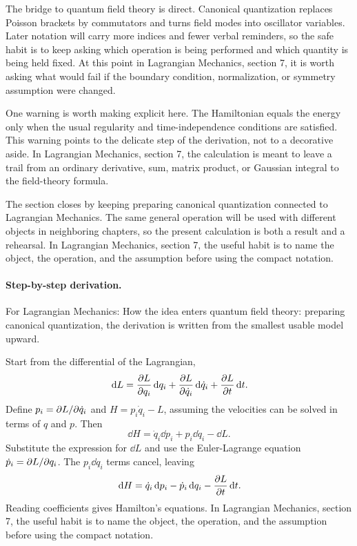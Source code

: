 The bridge to quantum field theory is direct.  Canonical quantization replaces Poisson brackets by commutators and turns field modes into oscillator variables.  Later notation will carry more indices and fewer verbal reminders, so the safe habit is to keep asking which operation is being performed and which quantity is being held fixed.  At this point in Lagrangian Mechanics, section 7, it is worth asking what would fail if the boundary condition, normalization, or symmetry assumption were changed.

One warning is worth making explicit here.  The Hamiltonian equals the energy only when the usual regularity and time-independence conditions are satisfied.  This warning points to the delicate step of the derivation, not to a decorative aside.  In Lagrangian Mechanics, section 7, the calculation is meant to leave a trail from an ordinary derivative, sum, matrix product, or Gaussian integral to the field-theory formula.

The section closes by keeping preparing canonical quantization connected to Lagrangian Mechanics.  The same general operation will be used with different objects in neighboring chapters, so the present calculation is both a result and a rehearsal.  In Lagrangian Mechanics, section 7, the useful habit is to name the object, the operation, and the assumption before using the compact notation.



\paragraph{Step-by-step derivation.}

For Lagrangian Mechanics: How the idea enters quantum field theory: preparing canonical quantization, the derivation is written from the smallest usable model upward.

Start from the differential of the Lagrangian,
\[
  \,\mathrm d L=\frac{\partial L}{\partial q_i}\,\mathrm d q_i+\frac{\partial L}{\partial\dot q_i}\,\mathrm d\dot q_i+\frac{\partial L}{\partial t}\,\mathrm d t.
\]
Define \(p_i=\partial L/\partial\dot q_i\) and \(H=p_i\dot q_i-L\), assuming the velocities can be solved in terms of \(q\) and \(p\).  Then
\[
  \dd H=\dot q_i\dd p_i+p_i\dd\dot q_i-\dd L.
\]
Substitute the expression for \(\dd L\) and use the Euler-Lagrange equation \(\dot p_i=\partial L/\partial q_i\).  The \(p_i\dd\dot q_i\) terms cancel, leaving
\[
  \,\mathrm d H=\dot q_i\,\mathrm d p_i-\dot p_i\,\mathrm d q_i-\frac{\partial L}{\partial t}\,\mathrm d t.
\]
Reading coefficients gives Hamilton's equations.  In Lagrangian Mechanics, section 7, the useful habit is to name the object, the operation, and the assumption before using the compact notation.

